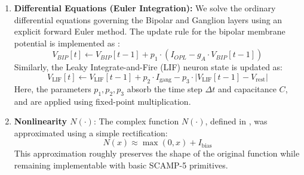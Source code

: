 \documentclass{article}
\begin{document}
\begin{enumerate}
    \item \textbf{Differential Equations (Euler Integration):}
    We solve the ordinary differential equations governing the Bipolar and Ganglion layers using an explicit forward Euler method. The update rule for the bipolar membrane potential is implemented as :
    \begin{equation}
        V_{BIP}[t] \leftarrow V_{BIP}[t-1] + p_{1} \cdot (I_{OPL} - g_{A} \cdot V_{BIP}[t-1])
    \end{equation}
    Similarly, the Leaky Integrate-and-Fire (LIF) neuron state is updated as:
    \begin{equation}
        V_\text{LIF}[t] \leftarrow V_\text{LIF}[t-1] + p_2 \cdot I_\text{gang} -  p_3 \cdot |V_\text{LIF}[t-1] - V_\text{rest}|
        \label{eq:LIF_int}
    \end{equation}
    Here, the parameters $p_1, p_2, p_3$ absorb the time step $\Delta t$ and capacitance $C$, and are applied using fixed-point multiplication.
    \item \textbf{Nonlinearity \( N(\cdot) \)}:  
    The complex function \( N(\cdot) \), defined in \cite{wohrer_virtual_2009, philip_neuromorphic_2025}, was approximated using a simple rectification:
    \begin{equation}
        N(x) \approx \max(0, x) + I_\text{bias}
    \end{equation}
    This approximation roughly preserves the shape of the original function while remaining implementable with basic SCAMP-5 primitives.
\end{enumerate}
\end{document}
